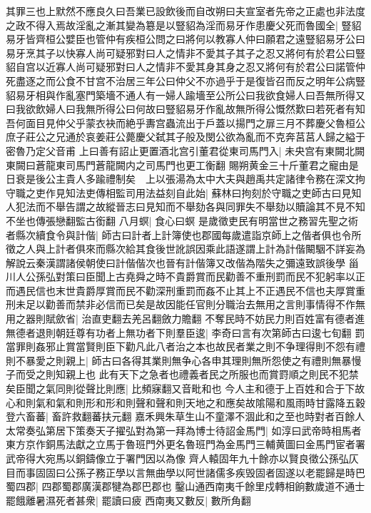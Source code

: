 其罪三也上默然不應良久曰吾業已設飲後而自改朔曰夫宣室者先帝之正處也非法度之政不得入焉故淫亂之漸其變為簒是以豎貂為淫而易牙作患慶父死而魯國全|{
	豎貂易牙皆齊桓公嬖臣也管仲有疾桓公問之曰將何以教寡人仲曰願君之遠豎貂易牙公曰易牙烹其子以快寡人尚可疑邪對曰人之情非不愛其子其子之忍又將何有於君公曰豎貂自宫以近寡人尚可疑邪對曰人之情非不愛其身其身之忍又將何有於君公曰諾管仲死盡逐之而公食不甘宫不治居三年公曰仲父不亦過乎于是復皆召而反之明年公病豎貂易牙相與作亂塞門築墻不通人有一婦人踰墻至公所公曰我欲食婦人曰吾無所得又曰我欲飲婦人曰我無所得公曰何故曰豎貂易牙作亂故無所得公慨然歎曰若死者有知吾何面目見仲父乎蒙衣袂而絶乎夀宫蟲流出于戶蓋以揚門之扉三月不葬慶父魯桓公庶子莊公之兄通於哀姜莊公薨慶父弑其子般及閔公欲為亂而不克奔莒莒人歸之縊于密魯乃定父音甫}
上曰善有詔止更置酒北宫引董君從東司馬門入|{
	未央宫有東闕北闕東闕曰蒼龍東司馬門蒼龍闕内之司馬門也更工衡翻}
賜朔黄金三十斤董君之寵由是日衰是後公主貴人多踰禮制矣　上以張湯為太中大夫與趙禹共定諸律令務在深文拘守職之吏作見知法吏傳相監司用法益刻自此始|{
	蘇林曰拘刻於守職之吏師古曰見知人犯法而不舉告謂之故縱晉志曰見知而不舉劾各與同罪失不舉劾以贖論其不見不知不坐也傳張戀翻監古銜翻}
八月螟|{
	食心曰螟}
是歲徵吏民有明當世之務習先聖之術者縣次續食令與計偕|{
	師古曰計者上計簿使也郡國每歲遣詣京師上之偕者俱也令所徵之人與上計者俱來而縣次給其食後世訛誤因乘此語遂謂上計為計偕闞駰不詳妄為解說云秦漢謂諸侯朝使曰計偕偕次也晉有計偕簿又改偕為階失之彌遠致誤後學}
甾川人公孫弘對策曰臣聞上古堯舜之時不貴爵賞而民勸善不重刑罰而民不犯躬率以正而遇民信也末世貴爵厚賞而民不勸深刑重罰而姦不止其上不正遇民不信也夫厚賞重刑未足以勸善而禁非必信而已矣是故因能任官則分職治去無用之言則事情得不作無用之器則賦歛省|{
	治直吏翻去羌呂翻斂力贍翻}
不奪民時不妨民力則百姓富有德者進無德者退則朝廷尊有功者上無功者下則羣臣逡|{
	李奇曰言有次第師古曰逡七旬翻}
罰當罪則姦邪止賞當賢則臣下勸凡此八者治之本也故民者業之則不争理得則不怨有禮則不暴愛之則親上|{
	師古曰各得其業則無争心各申其理則無所怨使之有禮則無暴慢子而受之則知親上也}
此有天下之急者也禮義者民之所服也而賞罸順之則民不犯禁矣臣聞之氣同則從聲比則應|{
	比頻寐翻又音毗和也}
今人主和德于上百姓和合于下故心和則氣和氣和則形和形和則聲和聲和則天地之和應矣故隂陽和風雨時甘露降五穀登六畜蕃|{
	畜許救翻蕃扶元翻}
嘉禾興朱草生山不童澤不涸此和之至也時對者百餘人太常奏弘第居下策奏天子擢弘對為第一拜為博士待詔金馬門|{
	如淳曰武帝時相馬者東方京作銅馬法獻之立馬于魯班門外更名魯班門為金馬門三輔黄圖曰金馬門宦者署武帝得大宛馬以銅鑄像立于署門因以為像}
齊人轅固年九十餘亦以賢良徵公孫弘仄目而事固固曰公孫子務正學以言無曲學以阿世諸儒多疾毁固者固遂以老罷歸是時巴蜀四郡|{
	四郡蜀郡廣漢郡犍為郡巴郡也}
鑿山通西南夷千餘里戍轉相餉數歲道不通士罷餓離暑濕死者甚衆|{
	罷讀曰疲}
西南夷又數反|{
	數所角翻}
